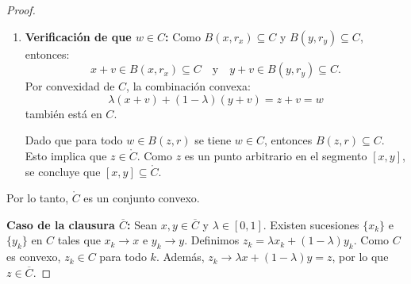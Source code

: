 \documentclass[12pt]{book}
\newtheorem{definition}{Definición}
\theoremstyle{definition}
\theoremstyle{plain}
\theoremstyle{remark}
\begin{document}
\begin{proof}
\begin{enumerate}
    \item \textbf{Verificación de que \( w \in C \):}
 Como \( B(x, r_x) \subseteq C \) y \( B(y, r_y) \subseteq C \), entonces:
        \[
        x + v \in B(x, r_x) \subseteq C \quad \text{y} \quad y + v \in B(y, r_y) \subseteq C.
        \]
Por convexidad de \( C \), la combinación convexa:
        \[
        \lambda(x + v) + (1-\lambda)(y + v) = z + v = w
        \]
        también está en \( C \).

Dado que para todo \( w \in B(z, r) \) se tiene \( w \in C \), entonces \( B(z, r) \subseteq C \).
Esto implica que \( z \in \mathring{C} \).
Como \( z \) es un punto arbitrario en el segmento \( [x, y] \), se concluye que \( [x, y] \subseteq \mathring{C} \).
\end{enumerate}
Por lo tanto, \( \mathring{C} \) es un conjunto convexo.

\medskip

    \textbf{Caso de la clausura \( \overline{C} \):}
    Sean \( x, y \in \overline{C} \) y \( \lambda \in [0,1] \). Existen sucesiones \( \{x_k\} \) e \( \{y_k\} \) en \( C \) tales que \( x_k \to x \) e \( y_k \to y \). Definimos \( z_k = \lambda x_k + (1-\lambda)y_k \). Como \( C \) es convexo, \( z_k \in C \) para todo \( k \). Además, \( z_k \to \lambda x + (1-\lambda)y = z \), por lo que \( z \in \overline{C} \).
\end{proof}


\end{document}
